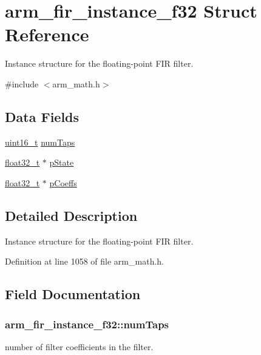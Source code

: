 \hypertarget{structarm__fir__instance__f32}{\section{arm\-\_\-fir\-\_\-instance\-\_\-f32 Struct Reference}
\label{structarm__fir__instance__f32}
}


Instance structure for the floating-\/point F\-I\-R filter.  




{\ttfamily \#include $<$arm\-\_\-math.\-h$>$}

\subsection*{Data Fields}
\begin{DoxyCompactItemize}
\item 
\hyperlink{stdint_8h_a273cf69d639a59973b6019625df33e30}{uint16\-\_\-t} \hyperlink{structarm__fir__instance__f32_a20cf98c92b5323799b7881c9ff4d2f7c}{num\-Taps}
\item 
\hyperlink{arm__math_8h_a4611b605e45ab401f02cab15c5e38715}{float32\-\_\-t} $\ast$ \hyperlink{structarm__fir__instance__f32_a7afcf4022e8560db9b8fd28b0d090a15}{p\-State}
\item 
\hyperlink{arm__math_8h_a4611b605e45ab401f02cab15c5e38715}{float32\-\_\-t} $\ast$ \hyperlink{structarm__fir__instance__f32_a1c9cfca901d5902afeb640f2831488f4}{p\-Coeffs}
\end{DoxyCompactItemize}


\subsection{Detailed Description}
Instance structure for the floating-\/point F\-I\-R filter. 

Definition at line 1058 of file arm\-\_\-math.\-h.



\subsection{Field Documentation}
\hypertarget{structarm__fir__instance__f32_a20cf98c92b5323799b7881c9ff4d2f7c}{
\subsubsection[{num\-Taps}]{ arm\-\_\-fir\-\_\-instance\-\_\-f32\-::num\-Taps}}\label{structarm__fir__instance__f32_a20cf98c92b5323799b7881c9ff4d2f7c}
number of filter coefficients in the filter. 


